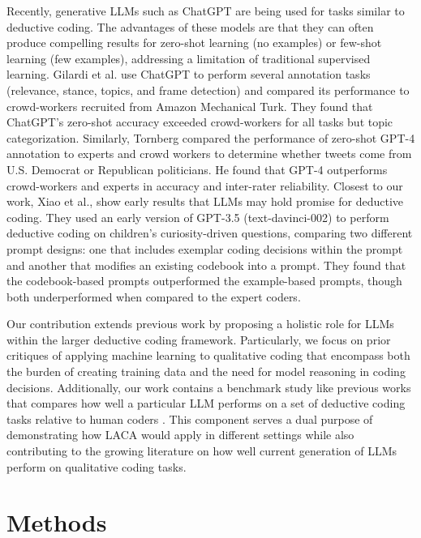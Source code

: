 \documentclass{article}
\begin{document}
Recently, generative LLMs such as ChatGPT are being used for tasks similar to deductive coding.  The advantages of these models are that they can often produce compelling results for zero-shot learning (no examples) or few-shot learning (few examples), addressing a limitation of traditional supervised learning.  Gilardi et al. \cite{gilardi_chatgpt_2023} use ChatGPT to perform several annotation tasks (relevance, stance, topics, and frame detection) and compared its performance to crowd-workers recruited from Amazon Mechanical Turk.  They found that ChatGPT’s zero-shot accuracy exceeded crowd-workers for all tasks but topic categorization.  Similarly, Tornberg \cite{tornberg_chatgpt-4_2023} compared the performance of zero-shot GPT-4 annotation to experts and crowd workers to determine whether tweets come from U.S. Democrat or Republican politicians. He found that GPT-4 outperforms crowd-workers and experts in accuracy and inter-rater reliability.  Closest to our work, Xiao et al., \cite{xiao_supporting_2023} show early results that LLMs may hold promise for deductive coding.  They used an early version of GPT-3.5 (text-davinci-002) to perform deductive coding on children’s curiosity-driven questions, comparing two different prompt designs:  one that includes exemplar coding decisions within the prompt and another that modifies an existing codebook into a prompt.  They found that the codebook-based prompts outperformed the example-based prompts, though both underperformed when compared to the expert coders. 

Our contribution extends previous work by proposing a holistic role for LLMs within the larger deductive coding framework.  Particularly, we focus on prior critiques of applying machine learning to qualitative coding that encompass both the burden of creating training data and the need for model reasoning in coding decisions.  Additionally, our work contains a benchmark study like previous works that compares how well a particular LLM performs on a set of deductive coding tasks relative to human coders \cite{gilardi_chatgpt_2023,tornberg_chatgpt-4_2023,xiao_supporting_2023}.  This component serves a dual purpose of demonstrating how LACA would apply in different settings while also contributing to the growing literature on how well current generation of LLMs perform on qualitative coding tasks.


\section{Methods}
\label{sec:methods}
\end{document}
